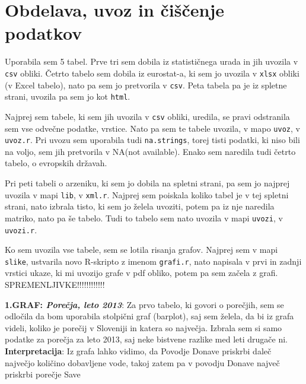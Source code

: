 \documentclass[11pt,a4paper]{article}
\begin{document}
\newpage
\section{Obdelava, uvoz in čiščenje podatkov}

Uporabila sem 5 tabel.
Prve tri sem dobila iz statističnega urada in jih uvozila v \verb|csv| obliki.
Četrto tabelo sem dobila iz eurostat-a, ki sem jo uvozila v \verb|xlsx| obliki (v Excel tabelo), nato pa sem jo pretvorila v \verb|csv|. Peta tabela pa je iz spletne strani, uvozila pa sem jo kot \verb|html|.

Najprej sem tabele, ki sem jih uvozila v \verb|csv| obliki, uredila, se pravi odstranila sem vse odvečne podatke, vrstice. Nato pa sem te tabele uvozila, v mapo \verb|uvoz|, v \verb|uvoz.r|. Pri uvozu sem uporabila tudi \verb|na.strings|, torej tisti podatki, ki niso bili na voljo, sem jih pretvorila v NA(not available). Enako sem naredila tudi četrto tabelo, o evropskih državah.

Pri peti tabeli o arzeniku, ki sem jo dobila na spletni strani, pa sem jo najprej uvozila v mapi \verb|lib|, v \verb|xml.r|. Najprej sem poiskala koliko tabel je v tej spletni strani, nato izbrala tisto, ki sem jo želela uvoziti, potem pa iz nje naredila matriko, nato pa še tabelo. Tudi to tabelo sem nato uvozila v mapi \verb|uvozi|, v \verb|uvozi.r|.

Ko sem uvozila vse tabele, sem se lotila risanja grafov. Najprej sem v mapi \verb|slike|, ustvarila novo R-skripto z imenom \verb|grafi.r|, nato napisala v prvi in zadnji vrstici ukaze, ki mi uvozijo grafe v pdf obliko, potem pa sem začela z grafi.\\

SPREMENLJIVKE!!!!!!!!!!!!

\newpage

\textbf{1.GRAF: \emph{Porečja, leto 2013}}: Za prvo tabelo, ki govori o porečjih, sem se odločila da bom uporabila stolpični graf (barplot), saj sem želela, da bi iz grafa videli, koliko je porečij v Sloveniji in katera so največja. Izbrala sem si samo podatke za porečja za leto 2013, saj neke bistvene razlike med leti drugače ni.\\
\textbf{Interpretacija}: Iz grafa lahko vidimo, da Povodje Donave priskrbi daleč največjo količino dobavljene vode, takoj zatem pa v povodju Donave največ priskrbi porečje Save

\end{document}
